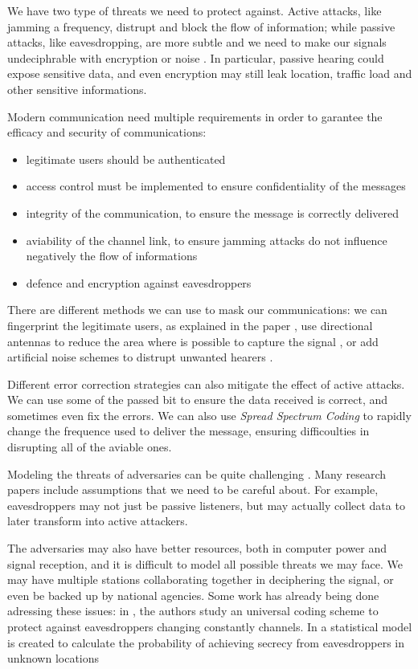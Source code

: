 We have two type of threats we need to protect against. Active attacks, like jamming a frequency, distrupt and block the flow of information; while passive attacks, like eavesdropping, are more subtle and we need to make our signals undeciphrable with encryption or noise \cite{5751298}. In particular, passive hearing could expose sensitive data, and even encryption may still leak location, traffic load and other sensitive informations.

Modern communication need multiple requirements in order to garantee the efficacy and security of communications:
\begin{itemize}
  \item legitimate users should be authenticated
  \item access control must be implemented to ensure confidentiality of the messages
  \item integrity of the communication, to ensure the message is correctly delivered
  \item aviability of the channel link, to ensure jamming attacks do not influence negatively the flow of informations
  \item defence and encryption against eavesdroppers
\end{itemize}

There are different methods we can use to mask our communications: we can fingerprint the legitimate users, as explained in the paper \cite{228fe14543ce4cefba3bb9cc11741362}, use directional antennas to reduce the area where is possible to capture the signal \cite{4543070}, or add artificial noise schemes to distrupt unwanted hearers \cite{1605889}.

Different error correction strategies can also mitigate the effect of active attacks. We can use some of the passed bit to ensure the data received is correct, and sometimes even fix the errors. We can also use \textit{Spread Spectrum Coding} to rapidly change the frequence used to deliver the message, ensuring difficoulties in disrupting all of the aviable ones.


Modeling the threats of adversaries can be quite challenging \cite{7120011}. Many research papers include assumptions that we need to be careful about. For example, eavesdroppers may not just be passive listeners, but may actually collect data to later transform into active attackers.

The adversaries may also have better resources, both in computer power and signal reception, and it is difficult to model all possible threats we may face. We may have multiple stations collaborating together in deciphering the signal, or even be backed up by national agencies. Some work has already being done adressing these issues: in \cite{5707054}, the authors study an universal coding scheme to protect against eavesdroppers changing constantly channels. In \cite{7543509} a statistical model is created to calculate the probability of achieving secrecy from eavesdroppers in unknown locations

